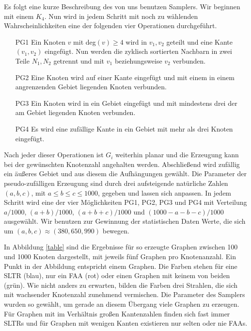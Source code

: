 Es folgt eine kurze Beschreibung des von uns benutzen Samplers. Wir beginnen mit einem $K_4$. Nun wird in jedem Schritt mit noch zu wählenden Wahrscheinlichkeiten eine der folgenden vier Operationen durchgeführt.

\begin{itemize}
\item[PG1] Ein Knoten $v$ mit deg$(v) \geq 4$ wird in $v_1,v_2$ geteilt und eine Kante $(v_1,v_2)$ eingefügt. Nun werden die zyklisch sortierten Nachbarn in zwei Teile $N_1,N_2$ getrennt und mit $v_1$ beziehungsweise $v_2$ verbunden.
\item[PG2] Eine Knoten wird auf einer Kante eingefügt und mit einem in einem angrenzenden Gebiet liegenden Knoten verbunden.
\item[PG3] Ein Knoten wird in ein Gebiet eingefügt und mit mindestens drei der am Gebiet liegenden Knoten verbunden. 
\item[PG4] Es wird eine zufällige Kante in ein Gebiet mit mehr als drei Knoten eingefügt.
\end{itemize}



Nach jeder dieser Operationen ist $G_i$ weiterhin planar und die Erzeugung kann bei der gewünschten Knotenzahl angehalten werden. Abschließend wird zufällig ein äußeres Gebiet und aus diesem die Aufhängungen gewählt. Die Parameter der pseudo-zufälligen Erzeugung sind durch drei aufsteigende natürliche Zahlen $(a,b,c)$, mit $a\leq b\leq c\leq 1000$, gegeben und lassen sich anpassen. In jedem Schritt wird eine der vier Möglichkeiten PG1, PG2, PG3 und PG4 mit Verteilung $a/1000$, $(a+b)/1000$, $(a+b+c)/1000$ und $(1000-a-b-c)/1000$ ausgewählt. Wir benutzen zur Gewinnung der statistischen Daten Werte, die sich um $(a,b,c) \approx (380,650,990)$ bewegen.

In Abbildung \ref{table} sind die Ergebnisse für so erzeugte Graphen zwischen 100 und 1000 Knoten dargestellt, mit jeweils fünf Graphen pro Knotenanzahl. Ein Punkt in der Abbildung entspricht einem Graphen. Die Farben stehen für eine SLTR (blau), nur ein FAA (rot) oder einen Graphen mit keinem von beiden (grün). 
Wie nicht anders zu erwarten, bilden die Farben drei Strahlen, die sich mit wachsender Knotenzahl zunehmend vermischen. Die Parameter des Samplers wurden so gewählt, um gerade an diesem Übergang viele Graphen zu erzeugen. Für Graphen mit im Verhältnis großen Kantenzahlen finden sich fast immer SLTRs und für Graphen mit wenigen Kanten existieren nur selten oder nie FAAs.

